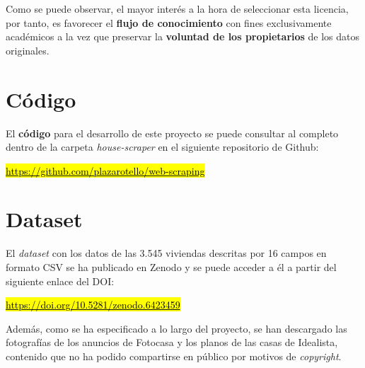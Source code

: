 \documentclass[12pt]{article}
\begin{document}
Como se puede observar, el mayor interés a la hora de seleccionar esta licencia, por tanto, es favorecer el \textbf{flujo de conocimiento} con fines exclusivamente académicos a la vez que preservar la \textbf{voluntad de los propietarios} de los datos originales. 

\vspace{-1.5em}\section{Código}\vspace{-1em}

El \textbf{código} para el desarrollo de este proyecto se puede consultar al completo dentro de la carpeta \textit{house-scraper} en el siguiente repositorio de Github: 

\vspace{-1em}\begin{center}\href{https://github.com/plazarotello/web-scraping}{\hl{https://github.com/plazarotello/web-scraping}}\end{center}\vspace{-1em}


\vspace{-1.5em}\section{Dataset}\vspace{-1em}

El \textit{dataset} con los datos de las 3.545 viviendas descritas por 16 campos en formato CSV se ha publicado en Zenodo y se puede acceder a él a partir del siguiente enlace del DOI: 

\vspace{-1em}\begin{center}\href{https://doi.org/10.5281/zenodo.6423459}{\hl{https://doi.org/10.5281/zenodo.6423459}}\end{center}\vspace{-1em}

Además, como se ha especificado a lo largo del proyecto, se han descargado las fotografías de los anuncios de Fotocasa y los planos de las casas de Idealista, contenido que no ha podido compartirse en público por motivos de \textit{copyright}.
\end{document}
